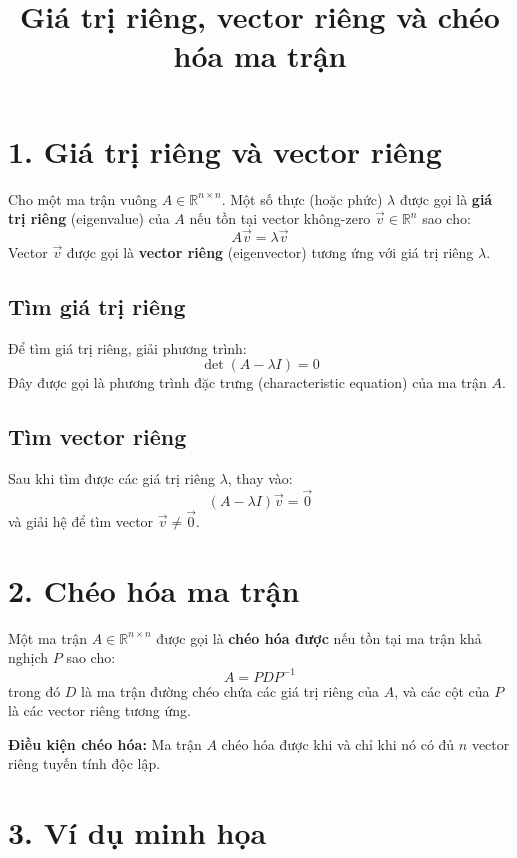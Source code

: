 \documentclass[12pt]{article}
\title{Giá trị riêng, vector riêng và chéo hóa ma trận}
\author{}
\date{}
\begin{document}
\maketitle

\section*{1. Giá trị riêng và vector riêng}

Cho một ma trận vuông \( A \in \mathbb{R}^{n \times n} \). Một số thực (hoặc phức) \( \lambda \) được gọi là \textbf{giá trị riêng} (eigenvalue) của \( A \) nếu tồn tại vector không-zero \( \vec{v} \in \mathbb{R}^n \) sao cho:
\[
A\vec{v} = \lambda \vec{v}
\]
Vector \( \vec{v} \) được gọi là \textbf{vector riêng} (eigenvector) tương ứng với giá trị riêng \( \lambda \).

\subsection*{Tìm giá trị riêng}

Để tìm giá trị riêng, giải phương trình:
\[
\det(A - \lambda I) = 0
\]
Đây được gọi là phương trình đặc trưng (characteristic equation) của ma trận \( A \).

\subsection*{Tìm vector riêng}

Sau khi tìm được các giá trị riêng \( \lambda \), thay vào:
\[
(A - \lambda I)\vec{v} = \vec{0}
\]
và giải hệ để tìm vector \( \vec{v} \neq \vec{0} \).

\section*{2. Chéo hóa ma trận}

Một ma trận \( A \in \mathbb{R}^{n \times n} \) được gọi là \textbf{chéo hóa được} nếu tồn tại ma trận khả nghịch \( P \) sao cho:
\[
A = PDP^{-1}
\]
trong đó \( D \) là ma trận đường chéo chứa các giá trị riêng của \( A \), và các cột của \( P \) là các vector riêng tương ứng.

\textbf{Điều kiện chéo hóa:} Ma trận \( A \) chéo hóa được khi và chỉ khi nó có đủ \( n \) vector riêng tuyến tính độc lập.

\section*{3. Ví dụ minh họa}
\end{document}
